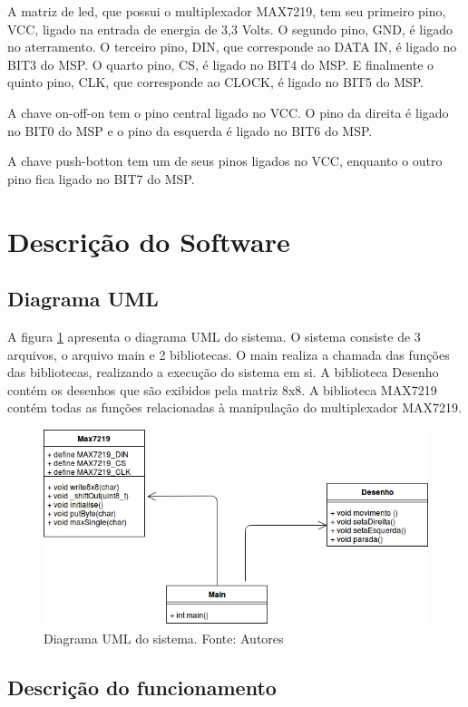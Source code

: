 \documentclass[conference]{IEEEtran}
\begin{document}
A matriz de led, que possui o multiplexador MAX7219, tem seu primeiro pino, VCC, ligado na entrada de energia de 3,3 Volts. O segundo pino, GND, é ligado no aterramento. O terceiro pino, DIN, que corresponde ao DATA IN, é ligado no BIT3 do MSP. O quarto pino, CS, é ligado no BIT4 do MSP. E finalmente o quinto pino, CLK, que corresponde ao CLOCK, é ligado no BIT5 do MSP. 

A chave on-off-on tem o pino central ligado no VCC. O pino da direita é ligado no BIT0 do MSP e o pino da esquerda é ligado no BIT6 do MSP. 

A chave push-botton tem um de seus pinos ligados no VCC, enquanto o outro pino fica ligado no BIT7 do MSP. 

\section{Descrição do Software}
\subsection{Diagrama UML}
A figura \ref{fig:uml} apresenta o diagrama UML do sistema. O sistema consiste de 3 arquivos, o arquivo main e 2 bibliotecas. O main realiza a chamada das funções das bibliotecas, realizando a execução do sistema em si. A biblioteca Desenho contém os desenhos que são exibidos pela matriz 8x8. A biblioteca MAX7219 contém todas as funções relacionadas à manipulação do multiplexador MAX7219. 

\begin{figure}[H]
  \centering
  \includegraphics[width=0.9\linewidth]{uml}
  \caption{Diagrama UML do sistema. Fonte: Autores}
  \label{fig:uml}
\end{figure}

\subsection{Descrição do funcionamento}
\end{document}
